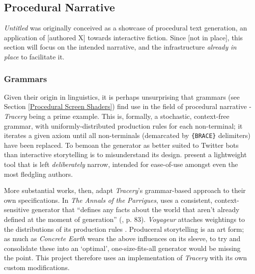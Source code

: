 \documentclass[a4paper, 11pt]{article}
\begin{document}
\begin{flushleft}
\vspace{5pt}

\vspace{5pt}

\subsection{Procedural Narrative} %

\textit{Untitled} was originally conceived as a showcase of procedural text generation, an application of [authored X] towards interactive fiction. Since [not in place], this section will focus on the intended narrative, and the infrastructure \textit{already in place} to facilitate it. 

\subsubsection{Grammars}

Given their origin in linguistics, it is perhaps unsurprising that grammars (see Section \ref{Procedural Screen Shaders}) find use in the field of procedural narrative - \textit{Tracery} \citep{comptonTracery} being a prime example. This is, formally, a stochastic, context-free grammar, with uniformly-distributed production rules for each non-terminal; it iterates a given axiom until all non-terminals (demarcated by \texttt{\{BRACE\}} delimiters) have been replaced. To bemoan the generator as better suited to Twitter bots than interactive storytelling is to misunderstand its design. \citeauthor{comptonTracery} present a lightweight tool that is left \textit{deliberately} narrow, intended for ease-of-use amongst even the most fledgling authors.

\vspace{5pt}\noindent
More substantial works, then, adapt \textit{Tracery}'s grammar-based approach to their own specifications. In \textit{The Annals of the Parrigues}, \citeauthor{shortParrigues} uses a consistent, context-sensitive generator that ``defines any facts about the world that aren’t already defined at the moment of generation'' (\citeyear{shortParrigues}, p. 83). \textit{Voyageur} \citep{diasVoyageur} attaches weightings to the distributions of its production rules \citep{diasVoyageurDescriptions}. Produceral storytelling is an art form; as much as \textit{Concrete Earth} wears the above influences on its sleeve, to try and consolidate these into an `optimal', one-size-fits-all generator would be missing the point. This project therefore uses an implementation of \textit{Tracery} with its own custom modifications.


\end{flushleft}
\end{document}
